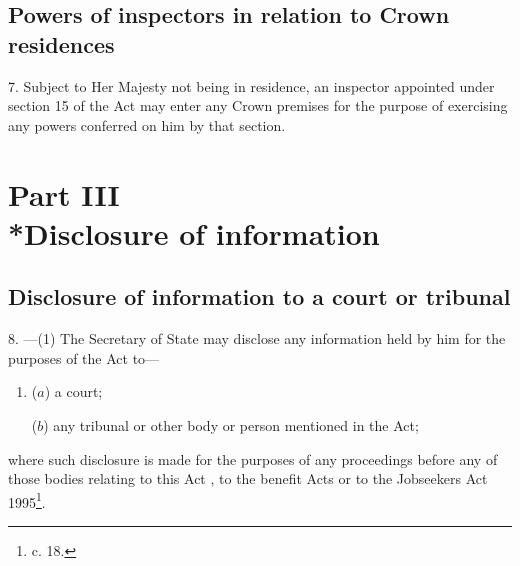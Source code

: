 \documentclass[a4paper,12pt]{article}
\begin{document}

\subsection[7. Powers of inspectors in relation to Crown residences]{Powers of inspectors in relation to Crown residences}

7.  Subject to Her Majesty not being in residence, an inspector appointed under section 15 of the Act may enter any Crown premises for the purpose of exercising any powers conferred on him by that section.

\section[Part III --- Disclosure of information]{Part III\\*Disclosure of information}

\renewcommand\parthead{--- Part III}

\subsection[8. Disclosure of information to a court or tribunal]{Disclosure of information to a court or tribunal}

8.%
---(1)  %
  The Secretary of State 
may disclose any information held by 
him  %
for the purposes of the Act to—
\begin{enumerate}\item[]
($a$) a court;

($b$) any tribunal or other body or person mentioned in the Act;
\end{enumerate}
where such disclosure is made for the purposes of any proceedings before any of those bodies relating to this Act%
, to the benefit Acts or to the Jobseekers Act 1995\footnote{ c. 18.}.  %
\end{document}
